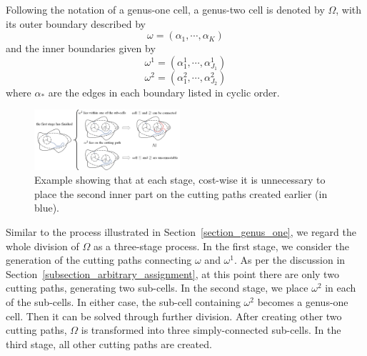 \documentclass[journal]{IEEEtran}
\begin{document}
Following the notation of a genus-one cell, a genus-two cell is denoted by $\Omega$, with its outer boundary described by 
\begin{equation}
\label{equ_omega_genus_two}
\omega = (\alpha_1, \cdots, \alpha_K)
\end{equation}
and the inner boundaries given by
\begin{equation}
\label{equ_omega_genus_two_1}
\omega^1 = (\alpha^1_1, \cdots, \alpha^1_{J_1})
\end{equation}
\begin{equation}
\label{equ_omega_genus_two_2}
\omega^2 = (\alpha^2_1, \cdots, \alpha^2_{J_2})
\end{equation}
where $\alpha_*$ are the edges in each boundary listed in cyclic order. 

\begin{figure}[t]
\centering
\includegraphics[width = 0.48\textwidth]{figures/proof/fig_no_on_cutting_path}
\caption{Example showing that at each stage, cost-wise it is unnecessary to place the second inner part on the 
cutting paths created earlier (in blue).}
\label{fig_no_on_cutting_path}
\end{figure}

Similar to the process illustrated in 
Section~\ref{section_genus_one}, 
we regard the whole division of $\Omega$ as a three-stage process. In the first stage, we consider the generation of the cutting paths connecting $\omega$ and $\omega^1$. As per the discussion in 
Section~\ref{subsection_arbitrary_assignment}, at this point there are only two cutting paths, generating two sub-cells. In the second stage, we place $\omega^2$ in each of the sub-cells. In either case, the sub-cell containing $\omega^2$ becomes a genus-one cell. Then it can be solved through further division. After creating other two cutting paths, $\Omega$ is transformed into three simply-connected sub-cells. In the third stage, all other cutting paths are created. 
\end{document}
